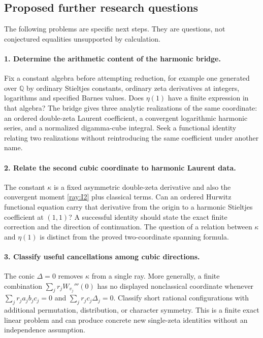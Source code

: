 \documentclass[11pt]{article}
\numberwithin{equation}{section}
\theoremstyle{definition}
\theoremstyle{remark}
\begin{document}
\subsection{Proposed further research questions}

The following problems are specific next steps. They are questions,
not conjectured equalities unsupported by calculation.

\paragraph{1. Determine the arithmetic content of the harmonic bridge.}
Fix a constant algebra before attempting reduction, for example one
generated over $\mathbb Q$ by ordinary Stieltjes constants, ordinary
zeta derivatives at integers, logarithms and specified Barnes values.
Does $\eta(1)$ have a finite expression in that algebra? The bridge
gives three analytic realizations of the same coordinate: an ordered
double-zeta Laurent coefficient, a convergent logarithmic harmonic
series, and a normalized digamma-cube integral. Seek a functional
identity relating two realizations without reintroducing the same
coefficient under another name.

\paragraph{2. Relate the second cubic coordinate to harmonic Laurent data.}
The constant $\kappa$ is a fixed asymmetric double-zeta derivative
and also the convergent moment \eqref{ray:I2} plus classical terms.
Can an ordered Hurwitz functional equation carry that derivative
from the origin to a harmonic Stieltjes coefficient at $(1,1)$?
A successful identity should state the exact finite correction and
the direction of continuation. The question of a relation between
$\kappa$ and $\eta(1)$ is distinct from the proved two-coordinate
spanning formula.

\paragraph{3. Classify useful cancellations among cubic directions.}
The conic $\Delta=0$ removes $\kappa$ from a single ray. More
generally, a finite combination $\sum_j r_jW_{v_j}'''(0)$ has no
displayed nonclassical coordinate whenever
$\sum_jr_ja_jb_jc_j=0$ and
$\sum_jr_jc_j\Delta_j=0$. Classify short rational configurations
with additional permutation, distribution, or character symmetry.
This is a finite exact linear problem and can produce concrete new
single-zeta identities without an independence assumption.
\end{document}
